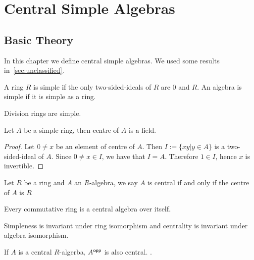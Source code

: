 \chapter{Central Simple Algebras}\label{sec:csa}

\section{Basic Theory}

In this chapter we define central simple algebras. We used some results
in~\cref{sec:unclassified}.

\begin{definition} A ring $R$ is simple if the only
  two-sided-ideals of $R$ are ${0}$ and $R$. An algebra is simple if it is
  simple as a ring.
  \leanok
\end{definition}

\begin{remark}
  Division rings are simple.
\end{remark}

\begin{lemma}
  \label{lem:center-simple-ring}
  Let $A$ be a simple ring, then centre of $A$ is a field. \leanok
\end{lemma}
\begin{proof}
  Let $0\ne x$ be an element of centre of $A$. Then $I := \{xy | y\in A\}$ is a
  two-sided-ideal of $A$. Since $0\ne x\in I$, we have that $I = A$. Therefore
  $1 \in I$, hence $x$ is invertible.
\end{proof}

\begin{definition}
  Let $R$ be a ring and $A$ an $R$-algebra, we say $A$ is central if and only if
  the centre of $A$ is $R$
  \leanok
\end{definition}

\begin{remark}
  Every commutative ring is a central algebra over itself.
\end{remark}

\begin{remark}
  Simpleness is invariant under ring isomorphism and centrality is invariant
  under algebra isomorphism.
\end{remark}

\begin{lemma}
  \label{lem:opp-central}
  If $A$ is a central $R$-algerba, $A^{\mathsf{opp}}$ is also central.
  \leanok
  .
\end{lemma}

